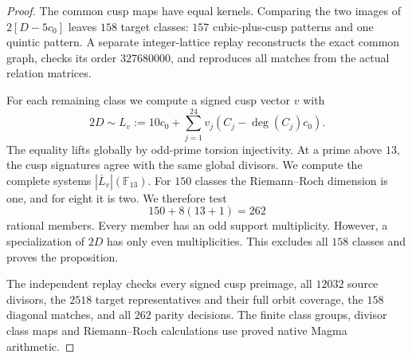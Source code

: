 \begin{proof}
The common cusp maps have equal kernels. Comparing the two images
of $2[D-5c_0]$ leaves $158$ target classes: $157$ cubic-plus-cusp
patterns and one quintic pattern. A separate integer-lattice replay
reconstructs the exact common graph, checks its order $327680000$,
and reproduces all matches from the actual relation matrices.

For each remaining class we compute a signed cusp vector $v$ with
\[
 2D\sim L_v:=10c_0+\sum_{j=1}^{24}v_j(C_j-\deg(C_j)c_0).
\]
The equality lifts globally by odd-prime torsion injectivity.
At a prime above $13$, the cusp signatures agree with the same
global divisors. We compute the complete systems
$|\overline L_v|(\mathbb F_{13})$.
For $150$ classes the Riemann--Roch dimension is one, and for eight
it is two. We therefore test
\[
 150+8(13+1)=262
\]
rational members. Every member has an odd support multiplicity.
However, a specialization of $2D$ has only even multiplicities.
This excludes all $158$ classes and proves the proposition.

The independent replay checks every signed cusp preimage, all
$12032$ source divisors, the $2518$ target representatives and their
full orbit coverage, the $158$ diagonal matches, and all $262$
parity decisions. The finite class groups, divisor class maps and
Riemann--Roch calculations use proved native Magma arithmetic.
\end{proof}
